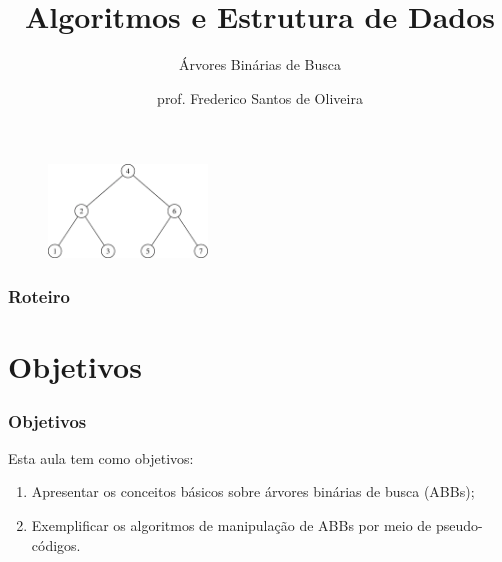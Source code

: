 \documentclass[aspectratio=169]{beamer}
\title[Árvores Binárias de Busca]{Algoritmos e Estrutura de Dados}
\subtitle{Árvores Binárias de Busca}
\author[Frederico Santos de Oliveira]{prof. Frederico Santos de Oliveira}
\institute[UFMT]{Universidade Federal de Mato Grosso\\ Faculdade de Engenharia}
\date{}
\begin{document}
\begin{frame}
\titlepage %

\begin{figure}[!h]
  \centering
   \includegraphics[width=120pt]{imagens/introducao.png}
  \label{fig_introducao}
\end{figure}
\end{frame}


\begin{frame}
\frametitle{Roteiro} %
\tableofcontents %
\end{frame}


\section{Objetivos}

\begin{frame}
\frametitle{Objetivos}

Esta aula tem como objetivos:

\begin{enumerate}
\item Apresentar os conceitos básicos sobre árvores binárias de busca (ABBs);
\item Exemplificar os algoritmos de manipulação de ABBs por meio de pseudo-códigos.
\end{enumerate}

\end{frame}
\end{document}
